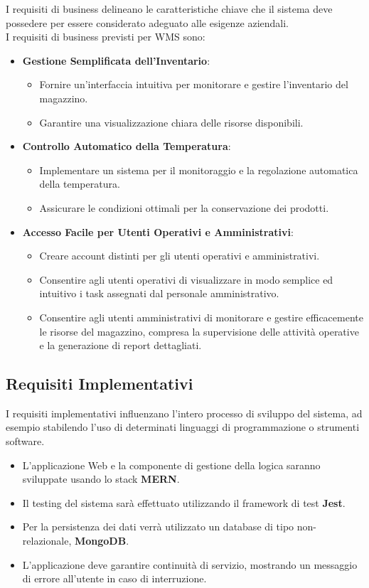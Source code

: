 I requisiti di business delineano le caratteristiche chiave che il sistema deve possedere
per essere considerato adeguato alle esigenze aziendali.\\
I requisiti di business previsti per WMS sono:
\begin{itemize}
    \item \textbf{Gestione Semplificata dell'Inventario}:
    \begin{itemize}
        \item Fornire un'interfaccia intuitiva per monitorare e gestire l'inventario del magazzino.
        \item Garantire una visualizzazione chiara delle risorse disponibili.
    \end{itemize}
    \item \textbf{Controllo Automatico della Temperatura}:
    \begin{itemize}
        \item Implementare un sistema per il monitoraggio e la regolazione automatica della temperatura.
        \item Assicurare le condizioni ottimali per la conservazione dei prodotti.
    \end{itemize}
    \item \textbf{Accesso Facile per Utenti Operativi e Amministrativi}:
    \begin{itemize}
        \item Creare account distinti per gli utenti operativi e amministrativi.
        \item Consentire agli utenti operativi di visualizzare in modo semplice ed intuitivo i task assegnati dal personale amministrativo.
        \item Consentire agli utenti amministrativi di monitorare e gestire efficacemente le risorse del magazzino, compresa la supervisione delle attività operative e la generazione di report dettagliati.
    \end{itemize}
\end{itemize}

\subsection{Requisiti Implementativi}

I requisiti implementativi influenzano l'intero processo di sviluppo del
sistema, ad esempio stabilendo l'uso di determinati linguaggi di programmazione o strumenti software.\\
\begin{itemize}
    \item L'applicazione Web e la componente di gestione della logica saranno sviluppate usando lo stack \textbf{MERN}.
    \item Il testing del sistema sarà effettuato utilizzando il framework di test \textbf{Jest}.
    \item Per la persistenza dei dati verrà utilizzato un database di tipo non-relazionale, \textbf{MongoDB}.
    \item L'applicazione deve garantire continuità di servizio, mostrando un messaggio di errore all'utente in caso di interruzione.
\end{itemize}